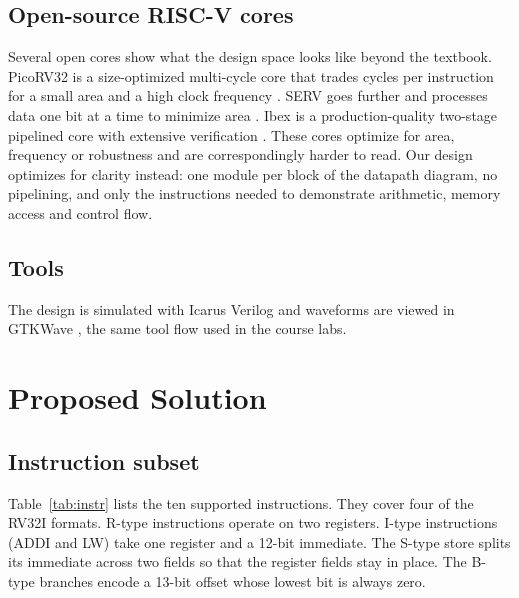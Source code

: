 \documentclass[conference]{IEEEtran}
\begin{document}
\subsection{Open-source RISC-V cores}
Several open cores show what the design space looks like beyond the textbook.
PicoRV32 is a size-optimized multi-cycle core that trades cycles per
instruction for a small area and a high clock frequency \cite{picorv32}. SERV
goes further and processes data one bit at a time to minimize area
\cite{serv}. Ibex is a production-quality two-stage pipelined core with
extensive verification \cite{ibex}. These cores optimize for area,
frequency or robustness and are correspondingly harder to read. Our design
optimizes for clarity instead: one module per block of the datapath diagram,
no pipelining, and only the instructions needed to demonstrate arithmetic,
memory access and control flow.

\subsection{Tools}
The design is simulated with Icarus Verilog \cite{iverilog} and waveforms are
viewed in GTKWave \cite{gtkwave}, the same tool flow used in the course labs.

\section{Proposed Solution}

\subsection{Instruction subset}
Table~\ref{tab:instr} lists the ten supported instructions. They cover four
of the RV32I formats. R-type instructions operate on two registers. I-type
instructions (ADDI and LW) take one register and a 12-bit immediate. The
S-type store splits its immediate across two fields so that the register
fields stay in place. The B-type branches encode a 13-bit offset whose lowest
bit is always zero.
\end{document}
